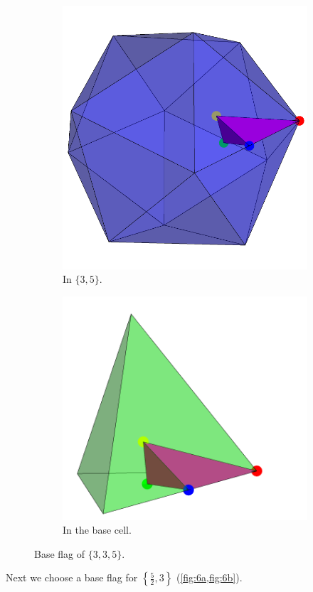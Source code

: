 \documentclass{article}
\theoremstyle{definition}
\begin{document}
	\begin{figure}[H]
		\begin{center}
			\begin{subfigure}{0.49\linewidth}
				\centering
				\includegraphics[width=0.9\linewidth]{fig5a}
				\caption{In $\{3,5\}$.}\label{fig:5a}
			\end{subfigure}
			\begin{subfigure}{0.49\linewidth}
				\centering
				\includegraphics[width=0.9\linewidth]{fig5b}
				\caption{In the base cell.}\label{fig:5b}
			\end{subfigure}
		\end{center}
		\caption{Base flag of $\{3,3,5\}$.}\label{fig:5}
	\end{figure}
	Next we choose a base flag for $\left\{\frac{5}{2},3\right\}$ (\cref{fig:6a,fig:6b}).
	
\end{document}
